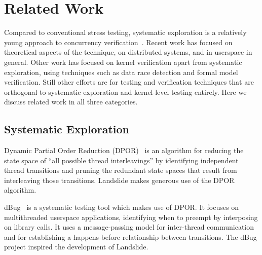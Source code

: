 \chapter{Related Work}


Compared to conventional stress testing, systematic exploration is a relatively young approach to concurrency verification~\cite{verisoft}.
Recent work has focused on theoretical aspects of the technique, on distributed systems, and in userspace in general.
Other work has focused on kernel verification apart from systematic exploration, using techniques such as data race detection and formal model verification.
Still other efforts are for testing and verification techniques that are orthogonal to systematic exploration and kernel-level testing entirely.
Here we discuss related work in all three categories.


\section{Systematic Exploration}

Dynamic Partial Order Reduction (DPOR)\hspace{0in}~\cite{dpor,distributed-dpor,sdpor,dbug-retreat} is an algorithm for reducing the state space of ``all possible thread interleavings'' by identifying independent thread transitions and pruning the redundant state spaces that result from interleaving those transitions. Landslide makes generous use of the DPOR algorithm.

dBug~\cite{dbug-ssv} is a systematic testing tool which makes use of DPOR. It focuses on multithreaded userspace applications, identifying when to preempt by interposing on  library calls. It uses a message-passing model for inter-thread communication and for establishing a happens-before relationship between transitions. The dBug project inspired the development of Landslide.

